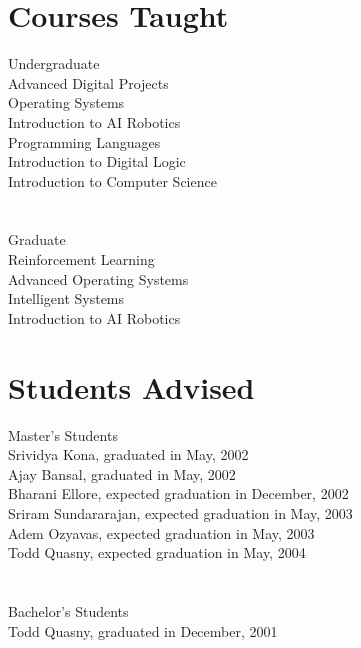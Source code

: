 \documentclass[11pt]{resume}
\begin{document}
\section{Courses Taught}{Undergraduate}
{\tenure \\
\hspace*{1em} Advanced Digital Projects\\
\hspace*{1em} Operating Systems\\
\hspace*{1em} Introduction to AI Robotics\\
\hspace*{1em}  Programming Languages\\
\hspace*{1em} Introduction to Digital Logic\\
\hspace*{1em} Introduction to Computer Science
}

\section{}{Graduate}
{\tenure \\
\hspace*{1em} Reinforcement Learning\\
\hspace*{1em} Advanced Operating Systems\\
\hspace*{1em} Intelligent Systems\\
\hspace*{1em} Introduction to AI Robotics
}

\section{Students Advised}{Master's Students}
{\tenure \\Srividya Kona, graduated in May, 2002\\
  Ajay Bansal, graduated in May, 2002\\
  Bharani Ellore, expected graduation in December, 2002\\
  Sriram Sundararajan,  expected graduation in May, 2003\\
  Adem Ozyavas, expected graduation in May, 2003\\
  Todd Quasny, expected graduation in May, 2004
}

\section{}{Bachelor's Students}
{\tenure \\Todd Quasny, graduated in December, 2001
}
\end{document}
